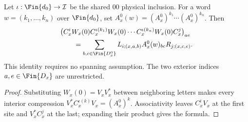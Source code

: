 \begin{lemma}
    \label{thm:mpo_joint_boundary_original_bulk}
    \leanok
    Let $\iota:\Fin{d_0}\to\mathcal I$ be the shared $00$ physical
    inclusion. For a word $w=(k_1,\ldots,k_n)$ over $\Fin{d_0}$, set
    $A_x^0(w)=(A_x^0)^{k_1}\cdots(A_x^0)^{k_n}$. Then
    \begin{align}
         & \bigl(C_x^i W_x(0)C_x^{\iota(k_1)}W_x(0)
        \cdots C_x^{\iota(k_n)}W_x(0)C_x^j\bigr)_{ae}\notag \\
         & \qquad=\sum_{b,c\in\Fin{D_x^0}}
        L_{i;(x,a,b)} A_x^0(w)_{bc} R_{j;(x,c,e)}.
    \end{align}
    This identity requires no spanning assumption. The two exterior
    indices $a,e\in\Fin{D_x}$ are unrestricted.
\end{lemma}
\begin{proof}
    \leanok
    Substituting $W_x(0)=V_xV_x^*$ between neighboring letters makes
    every interior compression
    $V_x^*C_x^{\iota(k)}V_x=(A_x^0)^k$.
    Associativity leaves $C_x^iV_x$ at the first site and
    $V_x^*C_x^j$ at the last; expanding their product gives the formula.
\end{proof}

